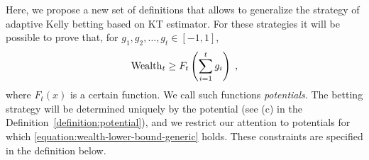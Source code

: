 Here, we propose a new set of definitions that allows to generalize the
strategy of adaptive Kelly betting based on KT estimator. For these strategies it will be
possible to prove that, for $g_1, g_2, \dots, g_t \in [-1,1]$,
\begin{equation}
\label{equation:wealth-lower-bound-generic}
\operatorname{Wealth}_t \ge F_t \left( \sum_{i=1}^t g_i \right) \; ,
\end{equation}
where $F_t(x)$ is a certain function. We call such functions \emph{potentials}.
The betting strategy will be determined uniquely by the potential (see (c) in the Definition~\ref{definition:potential}),
and we restrict our
attention to potentials for which \eqref{equation:wealth-lower-bound-generic}
holds. These constraints are specified in the definition below.
